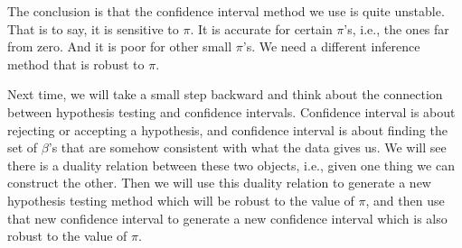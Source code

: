 \documentclass[11pt,a4paper]{amsart}
\theoremstyle{plain}
\theoremstyle{definition}
\begin{document}
		The conclusion is that the confidence interval method we use is quite unstable. That is to say, it is sensitive to $\pi$. It is accurate for certain $\pi$'s, i.e., the ones far from zero. And it is poor for other small $\pi$'s. We need a different inference method that is robust to $\pi$. \par 
		 Next time, we will take a small step backward and think about the connection between hypothesis testing and confidence intervals. Confidence interval is about rejecting or accepting a hypothesis, and confidence interval is about finding the set of $\beta$'s that are somehow consistent with what the data gives us. We will see there is a duality relation between these two objects, i.e., given one thing we can construct the other. Then we will use this duality relation to generate a new hypothesis testing method which will be robust to the value of $\pi$, and then use that new confidence interval to generate a new confidence interval which is also robust to the value of $\pi$. 
\end{document}
